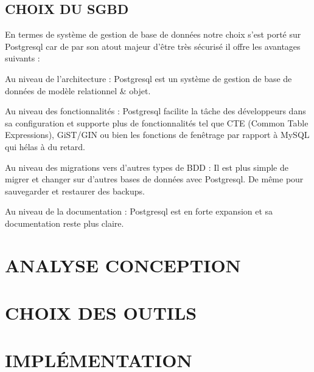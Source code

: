 \subsection{CHOIX DU SGBD}

En termes de système de gestion de base de données notre choix s’est porté sur Postgresql car de par son atout majeur d’être très sécurisé il offre les avantages suivants :  
\begin{list}{•}{ }
   \item Au niveau de l’architecture : Postgresql est un système de gestion de base de données de modèle relationnel \& objet.
   \item Au niveau des fonctionnalités : Postgresql facilite la tâche des développeurs dans sa configuration et supporte plus de fonctionnalités tel que CTE (Common Table Expressions), GiST/GIN ou bien les fonctions de fenêtrage par rapport à MySQL qui hélas à du retard.
   \item Au niveau des migrations vers d’autres types de BDD : Il est plus simple de migrer et changer sur d’autres bases de données avec Postgresql. De même pour sauvegarder et restaurer des backups.
 \item Au niveau de la documentation : Postgresql est en forte expansion et sa documentation reste plus claire.
\end{list}

\section{ANALYSE CONCEPTION}
\section{CHOIX DES OUTILS}
\section{IMPLÉMENTATION}






